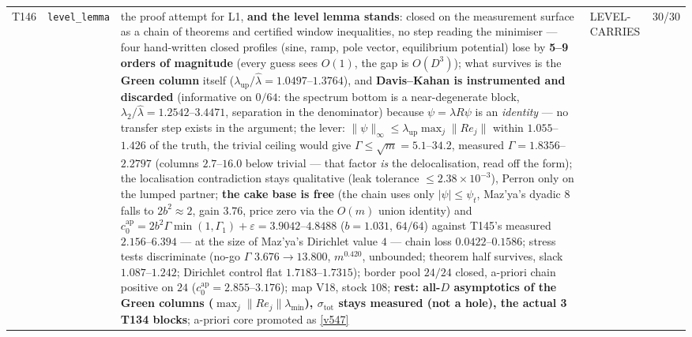 \documentclass[11pt,a4paper]{article}
\begin{document}
{\begin{xltabular}{\linewidth}{@{}p{0.95cm} >{\raggedright\arraybackslash}p{3.1cm} Y >{\raggedright\scriptsize\arraybackslash}p{3.35cm} p{1.15cm}@{}}
T146 & \texttt{\scriptsize level\_\allowbreak lemma} & the proof attempt for L1, \textbf{and the level lemma stands}: closed on the measurement surface as a chain of theorems and certified window inequalities, no step reading the minimiser --- four hand-written closed profiles (sine, ramp, pole vector, equilibrium potential) lose by \textbf{5--9 orders of magnitude} (every guess sees $O(1)$, the gap is $O(D^3)$); what survives is the \textbf{Green column} itself ($\lambda_{\mathrm{up}}/\hat\lambda=1.0497$--$1.3764$), and \textbf{Davis--Kahan is instrumented and discarded} (informative on $0/64$: the spectrum bottom is a near-degenerate block, $\lambda_2/\hat\lambda=1.2542$--$3.4471$, separation in the denominator) because $\psi=\lambda R\psi$ is an \emph{identity} --- no transfer step exists in the argument; the lever: $\|\psi\|_\infty\le\lambda_{\mathrm{up}}\max_j\|Re_j\|$ within $1.055$--$1.426$ of the truth, the trivial ceiling would give $\Gamma\le\sqrt m=5.1$--$34.2$, measured $\Gamma=1.8356$--$2.2797$ (columns $2.7$--$16.0$ below trivial --- that factor \emph{is} the delocalisation, read off the form); the localisation contradiction stays qualitative (leak tolerance $\le2.38\times10^{-3}$), Perron only on the lumped partner; \textbf{the cake base is free} (the chain uses only $|\psi|\le\psi_t$, Maz'ya's dyadic $8$ falls to $2b^2\approx2$, gain $3.76$, price zero via the $O(m)$ union identity) and $c_0^{\mathrm{ap}}=2b^2\Gamma\min(1,\Gamma_1)+\varepsilon=\mathbf{3.9042}$--$\mathbf{4.8488}$ ($b=1.031$, $64/64$) against T145's measured $2.156$--$6.394$ --- at the size of Maz'ya's Dirichlet value $4$ --- chain loss $0.0422$--$0.1586$; stress tests discriminate (no-go $\Gamma$ $3.676\to13.800$, $m^{0.420}$, unbounded; theorem half survives, slack $1.087$--$1.242$; Dirichlet control flat $1.7183$--$1.7315$); border pool $24/24$ closed, a-priori chain positive on $24$ ($c_0^{\mathrm{ap}}=2.855$--$3.176$); map V18, stock $108$; \textbf{rest: all-$D$ asymptotics of the Green columns ($\max_j\|Re_j\|\lambda_{\min}$), $\sigma_{\mathrm{tot}}$ stays measured (not a hole), the actual 3 T134 blocks}; a-priori core promoted as \vref{v547} & LEVEL-CARRIES & 30/30\\

\end{xltabular}}
\end{document}
